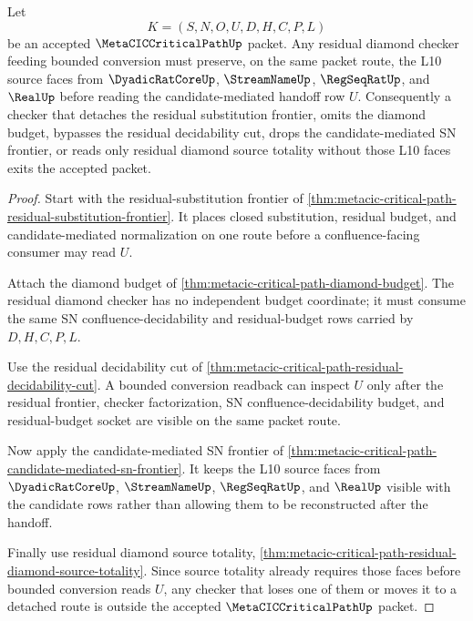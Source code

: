 \begin{theorem}
\label{thm:metacic-critical-path-residual-diamond-l10-source-nonescape}
Let
$$
K=(S,N,O,U,D,H,C,P,L)
$$
be an accepted $\MetaCICCriticalPathUp$ packet. Any residual diamond checker feeding bounded conversion must preserve, on the same packet route, the L10 source faces from $\DyadicRatCoreUp$, $\StreamNameUp$, $\RegSeqRatUp$, and $\RealUp$ before reading the candidate-mediated handoff row $U$. Consequently a checker that detaches the residual substitution frontier, omits the diamond budget, bypasses the residual decidability cut, drops the candidate-mediated SN frontier, or reads only residual diamond source totality without those L10 faces exits the accepted packet.
\end{theorem}
\begin{proof}
Start with the residual-substitution frontier of \autoref{thm:metacic-critical-path-residual-substitution-frontier}. It places closed substitution, residual budget, and candidate-mediated normalization on one route before a confluence-facing consumer may read $U$.

Attach the diamond budget of \autoref{thm:metacic-critical-path-diamond-budget}. The residual diamond checker has no independent budget coordinate; it must consume the same SN confluence-decidability and residual-budget rows carried by $D,H,C,P,L$.

Use the residual decidability cut of \autoref{thm:metacic-critical-path-residual-decidability-cut}. A bounded conversion readback can inspect $U$ only after the residual frontier, checker factorization, SN confluence-decidability budget, and residual-budget socket are visible on the same packet route.

Now apply the candidate-mediated SN frontier of \autoref{thm:metacic-critical-path-candidate-mediated-sn-frontier}. It keeps the L10 source faces from $\DyadicRatCoreUp$, $\StreamNameUp$, $\RegSeqRatUp$, and $\RealUp$ visible with the candidate rows rather than allowing them to be reconstructed after the handoff.

Finally use residual diamond source totality, \autoref{thm:metacic-critical-path-residual-diamond-source-totality}. Since source totality already requires those faces before bounded conversion reads $U$, any checker that loses one of them or moves it to a detached route is outside the accepted $\MetaCICCriticalPathUp$ packet.
\end{proof}

